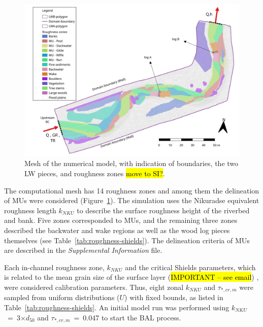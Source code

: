 \documentclass[draft,linenumbers,onecolumn]{agujournal2019} %
\begin{document}
\begin{figure}[!htbp]
	\centering
	\includegraphics[width=5.5in]{3_MU+mesh.jpg}
	\caption{Mesh of the numerical model, with indication of boundaries, the two LW pieces, and roughness zones \hl{move to SI?}.}
	\label{fig:mu_mesh}
\end{figure}


The computational mesh has 14 roughness zones and among them the delineation of MUs were considered (Figure~\ref{fig:mu_mesh}). The simulation uses the Nikuradse equivalent roughness length $k_{NKU}$  \cite{nikuradse1933stroemungsgesetze} to describe the surface roughness height of the riverbed and bank. Five zones corresponded to MUs, and the remaining three zones described the backwater and wake regions as well as the wood log pieces themselves (see Table~\ref{tab:roughness-shields}). The delineation criteria of MUs are described in the \textit{Supplemental Information} file. 



Each in-channel roughness zone, $k_{NKU}$ and the critical Shields parameters, which is related to the mean grain size of the surface layer (\hl{IMPORTANT -- see email}) , were considered calibration parameters. Thus, eight zonal $k_{NKU}$  and $\tau_{*,cr,m}$  were sampled from uniform distributions ($U$) with fixed bounds, as listed in Table~\ref{tab:roughness-shields}. An initial model run was performed using $k_{NKU}$~=~3$\times d_{50}$ and $\tau_{*,cr,m}$~=~0.047 to start the BAL process. 

\end{document}
